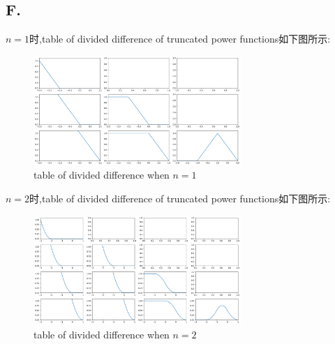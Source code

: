 \documentclass[a4paper]{article}
\begin{document}
\subsection*{F.}
$n=1$时,table of divided difference of truncated power functions如下图所示:
\begin{figure}[H]
    \centering
    \includegraphics[width=0.7\textwidth]{F1.png}
    \caption{table of divided difference when $n=1$}
    \label{Fig}
\end{figure}
$n=2$时,table of divided difference of truncated power functions如下图所示:
\begin{figure}[H]
    \centering
    \includegraphics[width=0.7\textwidth]{F2.png}
    \caption{table of divided difference when $n=2$}
    \label{Fig}
\end{figure}
\end{document}
